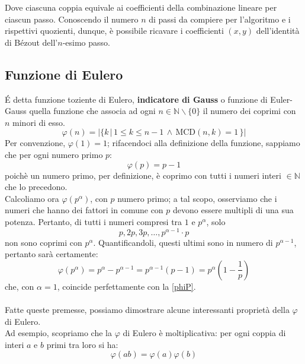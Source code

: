 \documentclass[a4paper,12pt]{article}
\begin{document}
Dove ciascuna coppia equivale ai coefficienti della combinazione lineare per ciascun passo. Conoscendo il numero $n$ di passi da compiere per l'algoritmo e i rispettivi quozienti, dunque, è possibile ricavare i coefficienti $(x,y)$ dell'identità di B\'ezout dell'$n$-esimo passo.

\subsection{Funzione di Eulero}
\'E detta funzione toziente di Eulero, \textbf{indicatore di Gauss} o funzione di Euler-Gauss quella funzione che associa ad ogni $n \in \mathbb{N}\backslash \{0\}$ il numero dei coprimi con $n$ minori di esso.
\begin{equation}\label{phi}
\varphi(n)=\bigg|\{k \, |\, 1 \leq k \leq n-1 \, \land \, \text{MCD}(n,k)=1\, \}\bigg|
\end{equation}
Per convenzione, $\varphi(1)=1$; rifacendoci alla definizione della funzione, sappiamo che per ogni numero primo $p$:
\begin{equation}\label{phiP}
    \varphi(p)=p-1
\end{equation}
poichè un numero primo, per definizione, è coprimo con tutti i numeri interi $\in \mathbb{N}$ che lo precedono.\\
Calcoliamo ora $\varphi(p^\alpha)$, con $p$ numero primo; a tal scopo, osserviamo che i numeri che hanno dei fattori in comune con $p$ devono essere multipli di una sua potenza. Pertanto, di tutti i numeri compresi tra $1$ e $p^\alpha$, solo
\begin{equation*}
    p,2p,3p,\hdots,p^{\alpha-1}\cdot p
\end{equation*}
non sono coprimi con $p^\alpha$. Quantificandoli, questi ultimi sono in numero di $p^{\alpha-1}$, pertanto sarà certamente:
\begin{equation}\label{phiPa}
\varphi(p^\alpha)=p^\alpha-p^{\alpha-1}=p^{\alpha-1}\left(p-1\right)=p^\alpha \left(1-\frac{1}{p}\right)
\end{equation}
che, con $\alpha=1$, coincide perfettamente con la \eqref{phiP}.\\\\
Fatte queste premesse, possiamo dimostrare alcune interessanti proprietà della $\varphi$ di Eulero.\\
Ad esempio, scopriamo che la $\varphi$ di Eulero è moltiplicativa: per ogni coppia di interi $a$ e $b$ primi tra loro si ha:
\begin{equation}\label{phiAB}
\varphi(ab)=\varphi(a)\varphi(b)
\end{equation}
\end{document}
